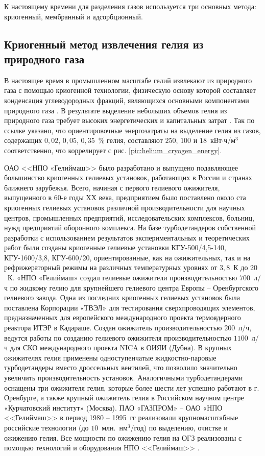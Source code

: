 К настоящему времени для разделения газов используется три основных метода: криогенный, мембранный и адсорбционный.



\subsection{Криогенный метод извлечения гелия из природного газа} \label{section_1_1_1}

В настоящее время в промышленном масштабе гелий извлекают из природного газа с помощью криогенной технологии, физическую основу которой составляет конденсация углеводородных фракций, являющихся основными компонентами природного газа \cite{Barron}.   В результате выделение небольших объемов гелия из природного газа требует высоких энергетических и капитальных  затрат \cite{Andreev, Simonenko}. Так по ссылке \cite{LenNIIHimMash} указано, что ориентировочные энергозатраты на выделение гелия из газов, содержащих $0,02$, $0,05$, $0,35$~\% гелия, составляют $250$, $100$ и $18$~кВт$\cdot$ч/м$^3$ соответственно, что коррелирует с рис. \ref{pic:helium_cryogen_energy}.

ОАО <<НПО «Гелиймаш>> было разработано и выпущено подавляющее большинство криогенных гелиевых установок, работающих в России и странах ближнего зарубежья. Всего, начиная с первого гелиевого ожижителя, выпущенного в 60-е годы ХХ века, предприятием было поставлено около ста криогенных гелиевых установок различной производительности для научных центров, промышленных предприятий, исследовательских комплексов, больниц, нужд предприятий оборонного комплекса. На базе турбодетандеров собственной разработки с использованием результатов экспериментальных и теоретических работ были созданы криогенные гелиевые установки КГУ-500/4,5-140, КГУ-1600/3,8, КГУ-600/20, ориентированные, как на ожижительных, так и на рефрижераторный режимы на различных температурных уровнях от $3,8$~К до $20$~К. «НПО «Гелиймаш» создал гелиевые ожижители производительностью $700$~л/ч по жидкому гелию для крупнейшего гелиевого центра Европы -- Оренбургского гелиевого завода. Одна из последних криогенных гелиевых установок была поставлена  Корпорации «ТВЭЛ» для тестирования сверхпроводящих элементов, предназначенных для европейского международного проекта термоядерного реактора ИТЭР в Кадараше. Создан ожижитель производительностью $200$~л/ч, ведутся работы по созданию гелиевого ожижителя производительностью $1100$~л/ч для СКО международного проекта NICA в ОИЯИ (Дубна). В крупных ожижителях гелия применены одноступенчатые жидкостно-паровые турбодетандеры вместо дроссельных вентилей, что позволило значительно увеличить производительность установок. Аналогичными турбодетандерами оснащены три ожижителя гелия, которые более шести лет успешно работают в г. Оренбурге, а также крупный ожижитель гелия в Российском научном центре «Курчатовский институт» (Москва). ПАО «ГАЗПРОМ» -- ОАО «НПО <<Гелиймаш>> в период 1980 -- 1995~гг реализовали крупномасштабные российские технологии (до $10$~млн.~нм$^3$/год) по выделению, очистке и ожижению гелия. Все мощности по ожижению гелия на ОГЗ реализованы с помощью технологий и оборудования НПО <<Гелиймаш>> \cite{GeliyMash_OG-1000}.

